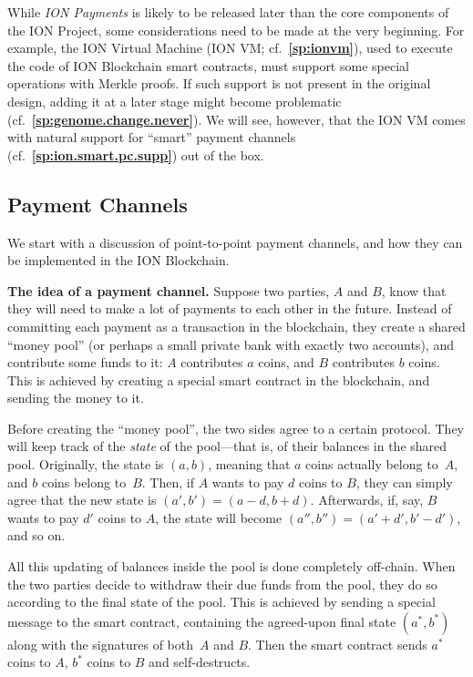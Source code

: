 \documentclass[12pt,oneside]{article}
\def\makepoint#1{\medbreak\noindent{\bf #1.\ }}
\def\nxsubpoint{\refstepcounter{subsubsection}%
  \smallbreak\makepoint{\thesubsubsection}}
\def\refpoint#1{{\rm\textbf{\ref{#1}}}}
\let\ptref=\refpoint
\def\embt(#1.){\textbf{#1.}}
\def\mysubsection#1{\subsection{#1}\fancyhead[C]{\small{\textsc{\textrm{\thesubsection.} #1}}}}
\begin{document}
While {\em ION Payments\/} is likely to be released later than the
core components of the ION Project, some considerations need to be
made at the very beginning. For example, the ION Virtual Machine (ION
VM; cf.~\ptref{sp:ionvm}), used to execute the code of ION Blockchain
smart contracts, must support some special operations with Merkle
proofs. If such support is not present in the original design, adding
it at a later stage might become problematic
(cf.~\ptref{sp:genome.change.never}). We will see, however, that the
ION VM comes with natural support for ``smart'' payment channels
(cf.~\ptref{sp:ion.smart.pc.supp}) out of the box.

\mysubsection{Payment Channels}

We start with a discussion of point-to-point payment channels, and how they can be implemented in the ION Blockchain.

\nxsubpoint \embt(The idea of a payment channel.)  Suppose two
parties, $A$ and $B$, know that they will need to make a lot of
payments to each other in the future. Instead of committing each
payment as a transaction in the blockchain, they create a shared
``money pool'' (or perhaps a small private bank with exactly two
accounts), and contribute some funds to it: $A$ contributes $a$
coins, and $B$ contributes $b$ coins. This is achieved by creating a
special smart contract in the blockchain, and sending the money to it.

Before creating the ``money pool'', the two sides agree to a certain
protocol. They will keep track of the {\em state\/} of the pool---that
is, of their balances in the shared pool. Originally, the state is
$(a,b)$, meaning that $a$ coins actually belong to~$A$, and $b$ coins
belong to~$B$. Then, if $A$ wants to pay $d$ coins to $B$, they can
simply agree that the new state is $(a',b')=(a-d,b+d)$. Afterwards,
if, say, $B$ wants to pay $d'$ coins to $A$, the state will become
$(a'',b'')=(a'+d',b'-d')$, and so on.

All this updating of balances inside the pool is done completely
off-chain. When the two parties decide to withdraw their due funds
from the pool, they do so according to the final state of the
pool. This is achieved by sending a special message to the smart
contract, containing the agreed-upon final state $(a^*,b^*)$ along
with the signatures of both~$A$ and $B$. Then the smart contract sends
$a^*$ coins to $A$, $b^*$ coins to $B$ and self-destructs.
\end{document}
